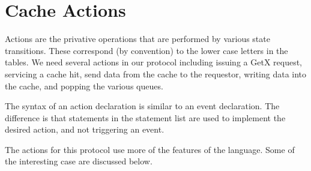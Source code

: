 \documentclass[11pt]{article}
\begin{document}
\section*{Cache Actions}

Actions are the privative operations that are performed by various
state transitions.  These correspond (by convention) to the lower case
letters in the tables.  We need several actions in our protocol
including issuing a GetX request, servicing a cache hit, send data
from the cache to the requestor, writing data into the cache, and
popping the various queues.

The syntax of an action declaration is similar to an event
declaration.  The difference is that statements in the statement list
are used to implement the desired action, and not triggering an event.


The actions for this protocol use more of the features of the
language.  Some of the interesting case are discussed below.
\end{document}
